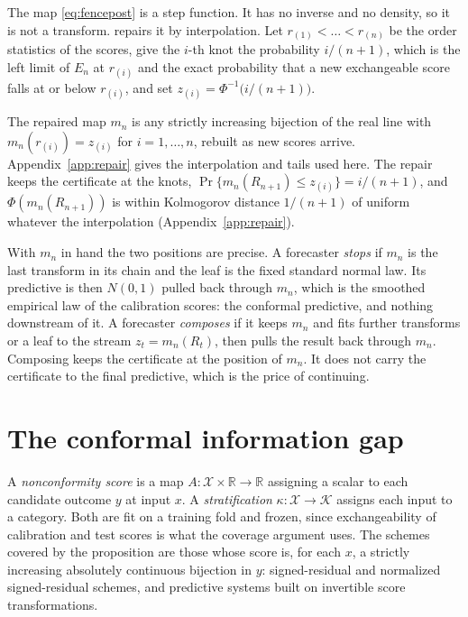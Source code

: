 \documentclass[11pt]{article}
\theoremstyle{remark}
\begin{document}
The map \eqref{eq:fencepost} is a step function. It has no inverse and no density,
so it is not a transform. \citet{cotton2026grammar} repairs it by interpolation. Let
$r_{(1)}<\dots<r_{(n)}$ be the order statistics of the scores, give the $i$-th knot
the probability $i/(n+1)$, which is the left limit of $E_n$ at $r_{(i)}$ and the
exact probability that a new exchangeable score falls at or below $r_{(i)}$, and set $z_{(i)}=\Phi^{-1}\big(i/(n+1)\big)$.


The repaired map $m_n$ is any strictly increasing bijection of the real line with
$m_n(r_{(i)})=z_{(i)}$ for $i=1,\dots,n$, rebuilt as new scores arrive.
Appendix~\ref{app:repair} gives the interpolation and tails used here. The repair
keeps the certificate at the knots, $\Pr\{m_n(R_{n+1})\le z_{(i)}\}=i/(n+1)$, and
$\Phi(m_n(R_{n+1}))$ is within Kolmogorov distance $1/(n+1)$ of uniform whatever the
interpolation (Appendix~\ref{app:repair}).

With $m_n$ in hand the two positions are precise. A forecaster \emph{stops} if $m_n$
is the last transform in its chain and the leaf is the fixed standard normal law.
Its predictive is then $N(0,1)$ pulled back through $m_n$, which is the smoothed
empirical law of the calibration scores: the conformal predictive, and nothing
downstream of it. A forecaster \emph{composes} if it keeps $m_n$ and fits further
transforms or a leaf to the stream $z_t=m_n(R_t)$, then pulls the result back
through $m_n$. Composing keeps the certificate at the position of $m_n$. It does not
carry the certificate to the final predictive, which is the price of continuing.

\section{The conformal information gap}\label{sec:floor}

A \emph{nonconformity score} is a map $A:\mathcal{X}\times\mathbb{R}\to
\mathbb{R}$ assigning a scalar to each candidate outcome $y$ at input $x$. A
\emph{stratification} $\kappa:\mathcal{X}\to\mathcal{K}$ assigns each input to
a category. Both are fit on a training fold and frozen, since exchangeability
of calibration and test scores is what the coverage argument uses. The schemes
covered by the proposition are those whose score is, for each $x$, a strictly
increasing absolutely continuous bijection in $y$: signed-residual and
normalized signed-residual schemes, and predictive systems built on invertible
score transformations. 
\end{document}
